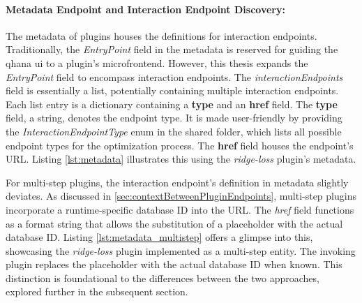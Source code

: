 \documentclass[
  a4paper,  %
  twoside,  %
  bibliography=totoc,
  headsepline,
  cleardoublepage=empty,
  parskip=half,
  draft=false
]{scrbook}
\begin{document}
\noindent\begin{minipage}{\linewidth}
  
\end{minipage}

\paragraph{Metadata Endpoint and Interaction Endpoint Discovery:}
\label{sec:metadataEndpoint}
The metadata of plugins houses the definitions for interaction endpoints.
Traditionally, the \emph{EntryPoint} field in the metadata is reserved for guiding the \gls{qhana} \gls{ui} to a plugin's microfrontend.
However, this thesis expands the \emph{EntryPoint} field to encompass interaction endpoints.
The \emph{interactionEndpoints} field is essentially a list, potentially containing multiple interaction endpoints.
Each list entry is a dictionary containing a \textbf{type} and an \textbf{href} field.
The \textbf{type} field, a string, denotes the endpoint type.
It is made user-friendly by providing the \emph{InteractionEndpointType} enum in the shared folder, which lists all possible endpoint types for the optimization process.
The \textbf{href} field houses the endpoint's URL.
Listing \ref{lst:metadata} illustrates this using the \emph{ridge-loss} plugin's metadata.

\noindent\begin{minipage}{\linewidth}
  
\end{minipage}

For multi-step plugins, the interaction endpoint's definition in metadata slightly deviates.
As discussed in \ref{sec:contextBetweenPluginEndpoints}, multi-step plugins incorporate a runtime-specific database ID into the URL.
The \emph{href} field functions as a format string that allows the substitution of a placeholder with the actual database ID.
Listing \ref{lst:metadata_multistep} offers a glimpse into this, showcasing the \emph{ridge-loss} plugin implemented as a multi-step entity.
The invoking plugin replaces the placeholder with the actual database ID when known.
This distinction is foundational to the differences between the two approaches, explored further in the subsequent section.

\noindent\begin{minipage}{\linewidth}
  
\end{minipage}
\end{document}
